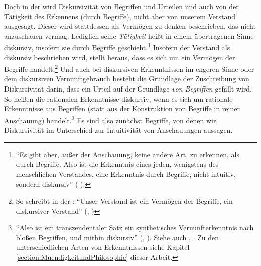 Doch in der  wird Diskursivität
von Begriffen und Urteilen und auch von der Tätigkeit des Erkennens (durch
Begriffe), nicht aber von unserem Verstand ausgesagt. Dieser wird stattdessen
als Vermögen zu denken beschrieben, das nicht anzuschauen vermag. Lediglich
seine \emph{Tätigkeit} heißt in einem übertragenen Sinne diskursiv, insofern sie
durch Begriffe geschieht.\footnote{\enquote{Es gibt aber, außer der Anschauung,
keine andere Art, zu erkennen, als durch Begriffe. Also ist die Erkenntnis eines
jeden, wenigstens des menschlichen Verstandes, eine Erkenntnis durch Begriffe,
nicht intuitiv, sondern diskursiv}
\mkbibparens{\cite[][B 92\,f.,]{Kant:KritikderreinenVernunft2003}
\cite[][III: 85.13--16]{Kant:GesammelteWerke1900ff.}}.} Insofern der Verstand als diskursiv beschrieben wird, stellt
 heraus, dass es sich um ein Vermögen der Begriffe
handelt.\footnote{So schreibt  in der : \enquote{Unser Verstand ist ein Vermögen der Begriffe,
 ein diskursiver Verstand}
\mkbibparens{\cite[][\S~77]{Kant:KritikderUrteilskraft2009}, \cite[][V:
406.16--17]{Kant:GesammelteWerke1900ff.}}} Und auch bei diskursiven
Erkenntnissen im engeren Sinne oder dem diskursiven Vernunftgebrauch besteht die Grundlage der
Zuschreibung von Diskursivität darin, dass ein Urteil auf der Grundlage
\emph{von Begriffen} gefällt wird. So heißen die
rationalen Erkenntnisse diskursiv, wenn es sich um rationale Erkenntnisse
aus Begriffen (statt aus der Konstruktion von Begriffe in reiner
Anschauung) handelt.\footnote{\enquote{Also ist ein
transzendentaler Satz ein synthetisches Vernunfterkenntnis nach bloßen
Begriffen, und mithin diskursiv} \mkbibparens{\cite[][B
750]{Kant:KritikderreinenVernunft2003}, \cite[][III:
474.21--23]{Kant:GesammelteWerke1900ff.}}. Siehe auch \cite[][B
747]{Kant:KritikderreinenVernunft2003}, \cite[][III:
472.25--28]{Kant:GesammelteWerke1900ff.}. Zu den unterschiedlichen Arten von
Erkenntnissen siehe Kapitel \ref{section:MuendigkeitundPhilosophie} dieser
Arbeit.} Es sind also zunächst Begriffe, von denen
wir Diskursivität im Unterschied zur Intuitivität von Anschauungen aussagen.

